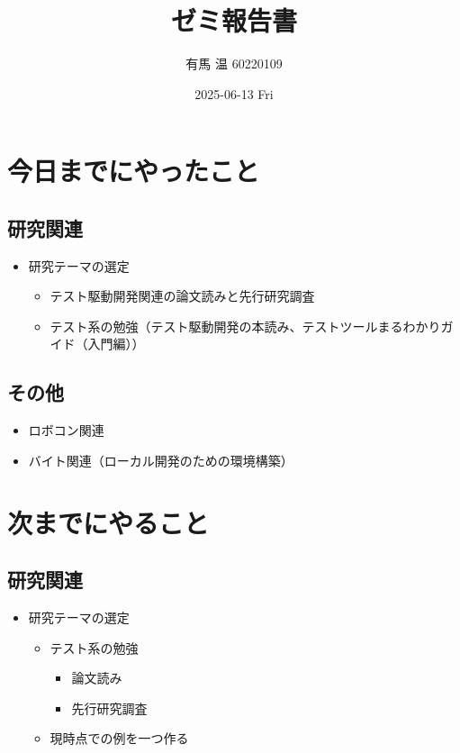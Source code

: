 \documentclass[uplatex, onecolumn, 10pt]{jsarticle}
\begin{document}
\title{\vspace{-40mm}\bf{\LARGE{ゼミ報告書}}}
\author{\vspace{-40mm}有馬 温  60220109}
\date{2025-06-13 Fri}
\maketitle


\section{今日までにやったこと}

\subsection*{研究関連}
\begin{itemize}
    \item 研究テーマの選定
    \begin{itemize}
        \item テスト駆動開発関連の論文読みと先行研究調査
    \end{itemize}
    \begin{itemize}
        \item テスト系の勉強（テスト駆動開発の本読み、テストツールまるわかりガイド（入門編））
    \end{itemize}
\end{itemize}

\subsection*{その他}
\begin{itemize}
	\item ロボコン関連
    \item バイト関連（ローカル開発のための環境構築）
\end{itemize}



\section{次までにやること}

\subsection*{研究関連}
\begin{itemize}
    \item 研究テーマの選定
    \begin{itemize}
        \item テスト系の勉強
        \begin{itemize}
            \item 論文読み
            \item 先行研究調査
        \end{itemize}
        \item 現時点での例を一つ作る
    \end{itemize}
\end{itemize}
\end{document}
